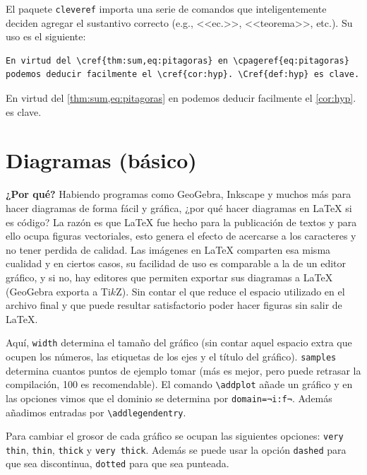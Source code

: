 \documentclass[intro-breve-latex.tex]{subfiles}
\begin{document}
El paquete \texttt{cleveref} importa una serie de comandos que inteligentemente deciden agregar el sustantivo correcto (e.g., <<ec.>>, <<teorema>>, etc.).
Su uso es el siguiente:
\begin{lstlisting}
En virtud del \cref{thm:sum,eq:pitagoras} en \cpageref{eq:pitagoras} podemos deducir facilmente el \cref{cor:hyp}. \Cref{def:hyp} es clave.
\end{lstlisting}
En virtud del \cref{thm:sum,eq:pitagoras} en  podemos deducir facilmente el \cref{cor:hyp}.
 es clave.

\section{Diagramas (básico)}
\textbf{¿Por qué?} Habiendo programas como GeoGebra, Inkscape y muchos más para hacer diagramas de forma fácil y gráfica, ¿por qué hacer diagramas en \LaTeX{} si es código?
La razón es que \LaTeX{} fue hecho para la publicación de textos y para ello ocupa figuras vectoriales, esto genera el efecto de acercarse a los caracteres y no tener perdida de calidad.
Las imágenes en \LaTeX{} comparten esa misma cualidad y en ciertos casos, su facilidad de uso es comparable a la de un editor gráfico, y si no, hay editores que permiten exportar sus diagramas a \LaTeX{} (GeoGebra exporta a Ti$k$Z).
Sin contar el que reduce el espacio utilizado en el archivo final y que puede resultar satisfactorio poder hacer figuras sin salir de \LaTeX{}.

Aquí, \texttt{width} determina el tamaño del gráfico (sin contar aquel espacio extra que ocupen los números, las etiquetas de los ejes y el título del gráfico). \texttt{samples} determina cuantos puntos de ejemplo tomar (más es mejor, pero puede retrasar la compilación, 100 es recomendable). El comando \lstinline|\addplot| añade un gráfico y en las opciones vimos que el dominio se determina por \lstinline|domain=¬i:f¬|. Además añadimos entradas por \lstinline|\addlegendentry|.

Para cambiar el grosor de cada gráfico se ocupan las siguientes opciones: \texttt{very thin}, \texttt{thin}, \texttt{thick} y \texttt{very thick}. Además se puede usar la opción \texttt{dashed} para que sea discontinua, \texttt{dotted} para que sea punteada. 
\end{document}
